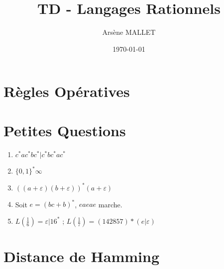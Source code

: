 \documentclass{article}
\title{TD - Langages Rationnels}
\date{\today}
\author{Arsène MALLET}
\begin{document}
\thispagestyle{firstpage}

\begin{center}
    \huge\bfseries{\@title}
\end{center}

\section{R\`egles Op\'eratives}

\section{Petites Questions}

\begin{enumerate}
    \item $c^*ac^*bc^* | c^*bc^*ac^*$
    \item $\{0, 1 \}^* \infty$
    \item $((a + \varepsilon)(b + \varepsilon))^* (a + \varepsilon)$
    \item Soit $e = (bc + b)^*$, $eaeae$ marche.
    \item $L(\frac{1}{6}) = \varepsilon |16^*$ ; $L(\frac{1}{7}) = (142857)*(e|\varepsilon)$
\end{enumerate}

\section{Distance de Hamming}
\end{document}
